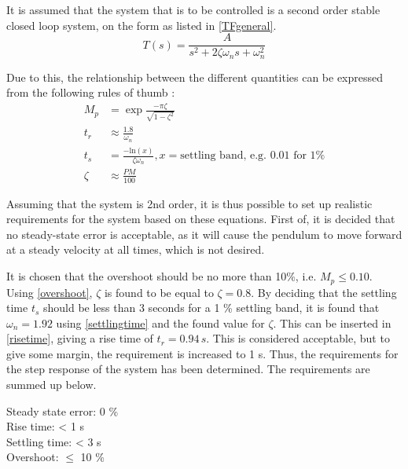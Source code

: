 It is assumed that the system that is to be controlled is a second order stable closed loop system, on the form as listed in \autoref{TFgeneral}.
\begin{equation}
T(s)=\frac{A}{s^2 + 2\zeta\omega_n s + \omega_n^2}
\label{TFgeneral}
\end{equation}
\begin{where}
\end{where}

Due to this, the relationship between the different quantities can be expressed from the following rules of thumb \citep[p. 152]{sou:Feedback}:
\begin{align}
M_p &= \exp{\frac{-\pi \zeta}{\sqrt{1-\zeta^2}}} \label{overshoot}\\
t_r &\approx \frac{1.8}{\omega_n}\label{risetime}\\
t_s &= \frac{-\text{ln}(x)}{\zeta\omega_n}, x = \text{settling band, e.g. 0.01 for 1\%} \label{settlingtime}\\
\zeta &\approx \frac{PM}{100}\label{zeta}
\end{align}

Assuming that the system is 2nd order, it is thus possible to set up realistic requirements for the system based on these equations. First of, it is decided that no steady-state error is acceptable, as it will cause the pendulum to move forward at a steady velocity at all times, which is not desired.

It is chosen that the overshoot should be no more than 10\%, i.e. $M_p \leq 0.10$. Using \autoref{overshoot}, $\zeta$ is found to be equal to $\zeta = 0.8$. By deciding that the settling time $t_s$ should be less than 3 seconds for a 1 \% settling band, it is found that $\omega_n = 1.92$ using \autoref{settlingtime} and the found value for $\zeta$.
This can be inserted in \autoref{risetime}, giving a rise time of $t_r = 0.94 \, s$. This is considered acceptable, but to give some margin, the requirement is increased to 1 s. Thus, the requirements for the step response of the system has been determined. The requirements are summed up below.

Steady state error: 0 \%\\
Rise time: < 1 s\\
Settling time: < 3 s\\
Overshoot: $\leq$ 10 \% 






